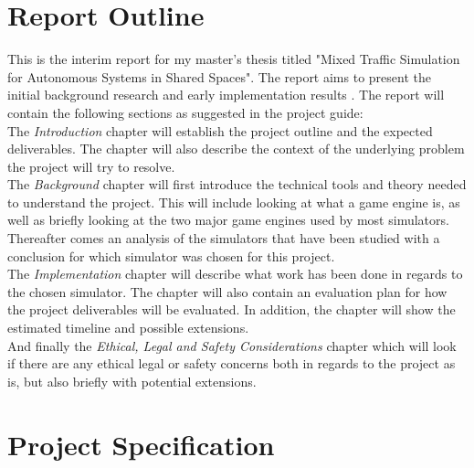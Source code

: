 \newcommand\tab[1][1cm]{\hspace*{#1}}

\section{Report Outline}
This is the interim report for my master's thesis titled "Mixed Traffic Simulation for Autonomous Systems in Shared Spaces". The report aims to present the initial background research and early implementation results \cite{studentGuideline}. The report will contain the following sections as suggested in the project guide:
\\ \tab The \emph{Introduction} chapter will establish the project outline and the expected deliverables. The chapter will also describe the context of the underlying problem the project will try to resolve.
\\ \tab The \emph{Background} chapter will first introduce the technical tools and theory needed to understand the project. This will include looking at what a game engine is, as well as briefly looking at the two major game engines used by most simulators. Thereafter comes an analysis of the simulators that have been studied with a conclusion for which simulator was chosen for this project. 
\\ \tab The \emph{Implementation} chapter will describe what work has been done in regards to the chosen simulator. The chapter will also contain an evaluation plan for how the project deliverables will be evaluated. In addition, the chapter will show the estimated timeline and possible extensions. 
\\ \tab And finally the \emph{Ethical, Legal and Safety Considerations} chapter which will look if there are any ethical legal or safety concerns both in regards to the project as is, but also briefly with potential extensions.

\pagebreak
\section{Project Specification} \label{ProjectSpec}
